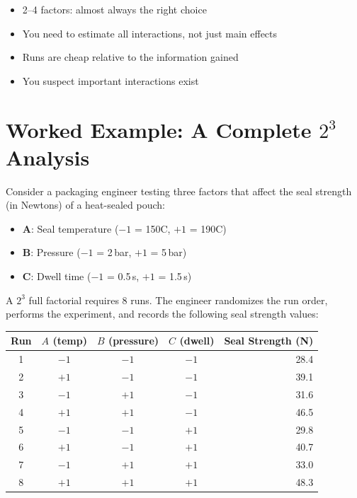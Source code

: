 \documentclass[11pt]{book}
\begin{document}
\begin{itemize}[nosep]
\item 2--4 factors: almost always the right choice
\item You need to estimate all interactions, not just main effects
\item Runs are cheap relative to the information gained
\item You suspect important interactions exist
\end{itemize}


\section{Worked Example: A Complete $2^3$ Analysis}

Consider a packaging engineer testing three factors that affect the seal
strength (in Newtons) of a heat-sealed pouch:

\begin{itemize}[nosep]
\item \textbf{A}: Seal temperature ($-1$ = 150\textdegree C, $+1$ = 190\textdegree C)
\item \textbf{B}: Pressure ($-1$ = 2\,bar, $+1$ = 5\,bar)
\item \textbf{C}: Dwell time ($-1$ = 0.5\,s, $+1$ = 1.5\,s)
\end{itemize}

\noindent A $2^3$ full factorial requires $8$ runs. The engineer randomizes the
run order, performs the experiment, and records the following seal strength
values:

\begin{center}
\begin{tabular}{ccccr}
\toprule
Run & $A$ (temp) & $B$ (pressure) & $C$ (dwell) & Seal Strength (N) \\
\midrule
1 & $-1$ & $-1$ & $-1$ & 28.4 \\
2 & $+1$ & $-1$ & $-1$ & 39.1 \\
3 & $-1$ & $+1$ & $-1$ & 31.6 \\
4 & $+1$ & $+1$ & $-1$ & 46.5 \\
5 & $-1$ & $-1$ & $+1$ & 29.8 \\
6 & $+1$ & $-1$ & $+1$ & 40.7 \\
7 & $-1$ & $+1$ & $+1$ & 33.0 \\
8 & $+1$ & $+1$ & $+1$ & 48.3 \\
\bottomrule
\end{tabular}
\end{center}
\end{document}
